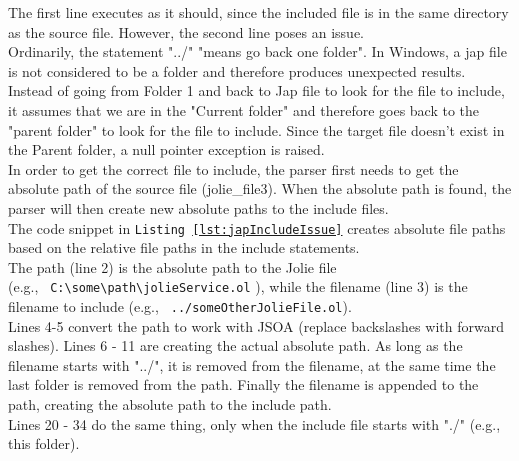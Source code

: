 \documentclass[12pt,a4paper]{article}
\begin{document}
The first line executes as it should, since the included file is in the same directory as the source file. However, the second line poses an issue. \\
Ordinarily, the statement "../" "means go back one folder". In Windows, a jap file is not considered to be a folder and therefore produces unexpected results. Instead of going from Folder 1 and back to Jap file to look for the file to include, it assumes that we are in the "Current folder" and therefore goes back to the "parent folder" to look for the file to include. Since the target file doesn't exist in the Parent folder, a null pointer exception is raised. \\
In order to get the correct file to include, the parser first needs to get the absolute path of the source file (jolie\_file3). When the absolute path is found, the parser will then create new absolute paths to the include files. \\

The code snippet in \texttt{Listing \ref{lst:japIncludeIssue}} creates absolute file paths based on the relative file paths in the include statements. \\
The path (line 2) is the absolute path to the Jolie file \\
(e.g., \verb| C:\some\path\jolieService.ol| ), while the filename (line 3) is the filename to include (e.g., \verb| ../someOtherJolieFile.ol|).\\
Lines 4-5 convert the path to work with JSOA (replace backslashes with forward slashes). Lines 6 - 11 are creating the actual absolute path. As long as the filename starts with "../", it is removed from the filename, at the same time the last folder is removed from the path. Finally the filename is appended to the path, creating the absolute path to the include path.\\
Lines 20 - 34 do the same thing, only when the include file starts with "./" (e.g., this folder).
\end{document}
